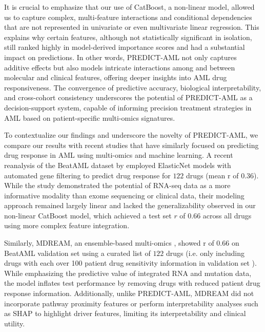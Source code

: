 \documentclass[pdflatex,sn-mathphys-num]{sn-jnl}%
\theoremstyle{thmstyleone}%
\theoremstyle{thmstyletwo}%
\theoremstyle{thmstylethree}%
\begin{document}
It is crucial to emphasize that our use of CatBoost, a non-linear model, allowed us to capture complex, multi-feature interactions and conditional dependencies that are not represented in univariate or even multivariate linear regression. 
This explains why certain features, although not statistically significant in isolation, still ranked highly in model-derived importance scores and had a substantial impact on predictions. 
In other words, PREDICT-AML not only captures additive effects but also models intricate interactions among and between molecular and clinical features, offering deeper insights into AML drug responsiveness. The convergence of predictive accuracy, biological interpretability, and cross-cohort consistency underscores the potential of PREDICT-AML as a decision-support system, capable of informing precision treatment strategies in AML based on patient-specific multi-omics signatures.

To contextualize our findings and underscore the novelty of PREDICT-AML, we compare our results with recent studies that have similarly focused on predicting drug response in AML using multi-omics and machine learning. A recent reanalysis of the BeatAML dataset by \cite{karathanasis2024machine} employed ElasticNet models with automated gene filtering to predict drug response for $122$ drugs (mean r of $0.36$). While the study demonstrated the potential of RNA-seq data as a more informative modality than exome sequencing or clinical data, their modeling approach remained largely linear and lacked the generalizability observed in our non-linear CatBoost model, which achieved a test set $r$ of 0.66 across all drugs using more complex feature integration.

Similarly, MDREAM, an ensemble-based multi-omics \cite{trac2023prediction}, showed r of 0.66 on BeatAML validation set using a curated list of $122$ drugs (i.e. only including drugs with each over 100 patient drug sensitivity information in validation set \cite{trac2023prediction}). While emphasizing the predictive value of integrated RNA and mutation data, the model inflates test performance by removing drugs with reduced patient drug response information. Additionally, unlike PREDICT-AML, MDREAM did not incorporate pathway proximity features or perform interpretability analyses such as SHAP to highlight driver features, limiting its interpretability and clinical utility.
\end{document}
